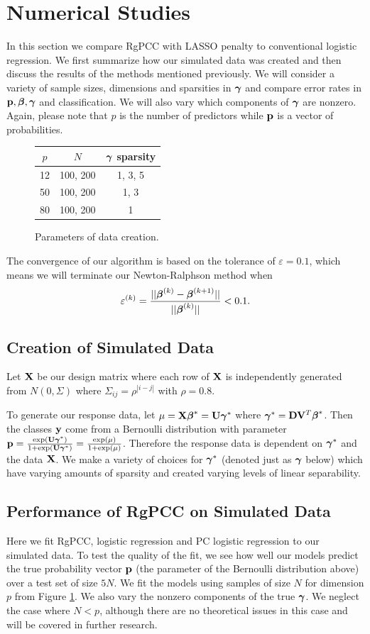 \documentclass[main.tex]{subfiles}
\begin{document}
\section{Numerical Studies}
In this section we compare RgPCC with LASSO penalty to conventional logistic regression. We first summarize how our simulated data was created and then discuss the results of the methods mentioned previously. We will consider a variety of sample sizes, dimensions and sparsities in $\boldsymbol \gamma$ and compare error rates in $\mathbf{p}, \boldsymbol \beta, \boldsymbol \gamma$ and classification. We will also vary which components of $\boldsymbol \gamma$ are nonzero. Again, please note that $p$ is the number of predictors while $\mathbf{p}$ is a vector of probabilities.

\begin{figure}[H]
	\begin{tabular}{c|c|c}
		$p$ & $N$ & $\boldsymbol \gamma$ sparsity \\ \hline
		12 & 100, 200 & 1, 3, 5 \\
		50 & 100, 200 & 1, 3 \\
		80 & 100, 200 & 1
	\end{tabular}
	\caption{Parameters of data creation.}
	\label{figure:params}
\end{figure}

The convergence of our algorithm is based on the tolerance of $\varepsilon = 0.1$, which means we will terminate our Newton-Ralphson method when $$\varepsilon^{(k)} = \frac{||\boldsymbol \beta^{(k)} - \boldsymbol \beta^{(k+1)}||}{||\boldsymbol \beta^{(k)}||} < 0.1.$$

\subsection{Creation of Simulated Data}
Let $\mathbf{X}$ be our design matrix where each row of $\mathbf{X}$ is independently generated from $N(0, \Sigma)$ where $\Sigma_{ij} = \rho^{|i - j|}$ with $\rho = 0.8$.

To generate our response data, let $\mu = \mathbf{X} \boldsymbol \beta^* = \mathbf{U} \boldsymbol \gamma^*$ where $\boldsymbol \gamma^* = \mathbf{D} \mathbf{V}^T \boldsymbol \beta^*$. Then the classes $\mathbf{y}$ come from a Bernoulli distribution with parameter $\mathbf{p} = \frac{\text{exp}(\mathbf{U} \boldsymbol \gamma^*)}{1 + \text{exp}(\mathbf{U} \boldsymbol \gamma^*)} = \frac{\text{exp}(\mu)}{1 + \text{exp}(\mu)}$. Therefore the response data is dependent on $\boldsymbol \gamma^*$ and the data $\mathbf{X}$. We make a variety of choices for $\boldsymbol \gamma^*$ (denoted just as $\boldsymbol \gamma$ below) which have varying amounts of sparsity and created varying levels of linear separability.

\subsection{Performance of RgPCC on Simulated Data}
Here we fit RgPCC, logistic regression and PC logistic regression to our simulated data. To test the quality of the fit, we see how well our models predict the true probability vector $\mathbf{p}$ (the parameter of the Bernoulli distribution above) over a test set of size $5N$. We fit the models using samples of size $N$ for dimension $p$ from Figure \ref{figure:params}. We also vary the nonzero components of the true $\boldsymbol \gamma$. We neglect the case where $N < p$, although there are no theoretical issues in this case and will be covered in further research.
\end{document}
